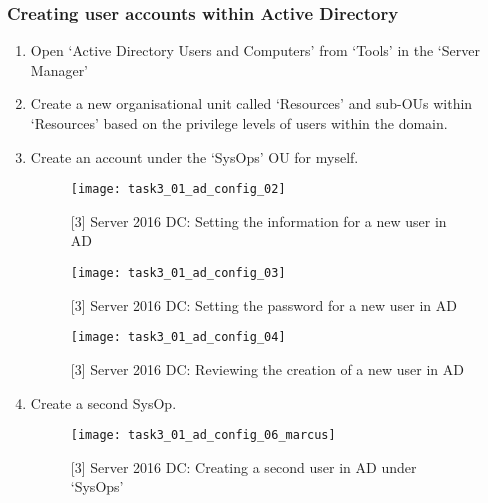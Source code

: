 \subsubsection{Creating user accounts within Active Directory}
\begin{enumerate}[series=task3methodology2]
  \item Open `Active Directory Users and Computers' from `Tools' in the `Server Manager'
  \item Create a new organisational unit called `Resources' and sub-OUs within `Resources' based on the privilege levels of users within the domain.
  \item Create an account under the `SysOps' OU for myself.
    \begin{figure}[H]
      \centering
      \captionsetup{skip=2pt}
      \texttt{[image: task3\_01\_ad\_config\_02]}
      \caption{[3] Server 2016 DC: Setting the information for a new user in AD}
      \label{fig:task3:ad_config_02}
    \end{figure}
    \begin{figure}[H]
      \centering
      \captionsetup{skip=2pt}
      \texttt{[image: task3\_01\_ad\_config\_03]}
      \caption{[3] Server 2016 DC: Setting the password for a new user in AD}
      \label{fig:task3:ad_config_03}
    \end{figure}
    \begin{figure}[H]
      \centering
      \captionsetup{skip=2pt}
      \texttt{[image: task3\_01\_ad\_config\_04]}
      \caption{[3] Server 2016 DC: Reviewing the creation of a new user in AD}
      \label{fig:task3:ad_config_04}
    \end{figure}
  \item Create a second SysOp.
    \begin{figure}[H]
      \centering
      \captionsetup{skip=2pt}
      \texttt{[image: task3\_01\_ad\_config\_06\_marcus]}
      \caption{[3] Server 2016 DC: Creating a second user in AD under `SysOps'}
      \label{fig:task3:ad_config_06}
    \end{figure}

\end{enumerate}
